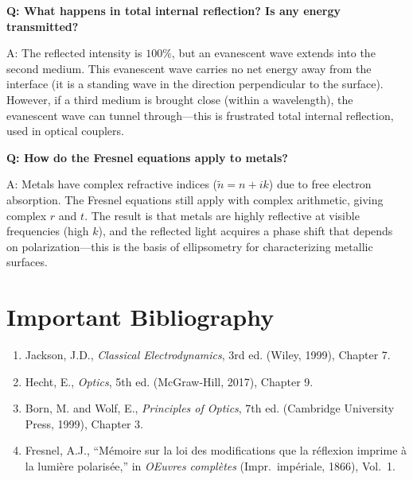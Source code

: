 \textbf{Q: What happens in total internal reflection? Is any energy transmitted?}

A: The reflected intensity is $100\%$, but an evanescent wave extends into the second medium. This evanescent wave carries no net energy away from the interface (it is a standing wave in the direction perpendicular to the surface). However, if a third medium is brought close (within a wavelength), the evanescent wave can tunnel through---this is frustrated total internal reflection, used in optical couplers.

\textbf{Q: How do the Fresnel equations apply to metals?}

A: Metals have complex refractive indices ($\tilde{n} = n + ik$) due to free electron absorption. The Fresnel equations still apply with complex arithmetic, giving complex $r$ and $t$. The result is that metals are highly reflective at visible frequencies (high $k$), and the reflected light acquires a phase shift that depends on polarization---this is the basis of ellipsometry for characterizing metallic surfaces.
\section*{Important Bibliography}

\begin{enumerate}
\item Jackson, J.D., \textit{Classical Electrodynamics}, 3rd ed. (Wiley, 1999), Chapter 7.
\item Hecht, E., \textit{Optics}, 5th ed. (McGraw-Hill, 2017), Chapter 9.
\item Born, M. and Wolf, E., \textit{Principles of Optics}, 7th ed. (Cambridge University Press, 1999), Chapter 3.
\item Fresnel, A.J., ``M\'emoire sur la loi des modifications que la r\'eflexion imprime \`a la lumi\`ere polaris\'ee,'' in \textit{ OEuvres compl\`etes} (Impr.\ imp\'eriale, 1866), Vol.\ 1.
\end{enumerate}

